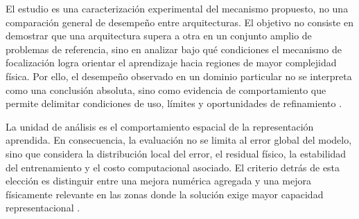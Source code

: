 \label{sec:alcance}

El estudio es una caracterización experimental del mecanismo propuesto, no una comparación general de desempeño entre arquitecturas. El objetivo no consiste en demostrar que una arquitectura supera a otra en un conjunto amplio de problemas de referencia, sino en analizar bajo qué condiciones el mecanismo de focalización logra orientar el aprendizaje hacia regiones de mayor complejidad física. Por ello, el desempeño observado en un dominio particular no se interpreta como una conclusión absoluta, sino como evidencia de comportamiento que permite delimitar condiciones de uso, límites y oportunidades de refinamiento \cite{shukla2024fair,krishnapriyan2021}.

La unidad de análisis es el comportamiento espacial de la representación aprendida. En consecuencia, la evaluación no se limita al error global del modelo, sino que considera la distribución local del error, el residual físico, la estabilidad del entrenamiento y el costo computacional asociado. El criterio detrás de esta elección es distinguir entre una mejora numérica agregada y una mejora físicamente relevante en las zonas donde la solución exige mayor capacidad representacional \cite{grossmann2024,krishnapriyan2021,shukla2024fair}.